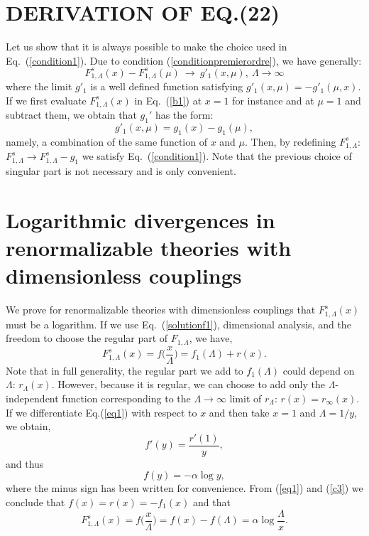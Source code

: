 \documentclass[floatfix,preprintnumbers,amsmath,amssymb,prb,12pt]{revtex4-1}
\begin{document}
{{\section{DERIVATION OF EQ.(22)}
Let us show that it is always possible to make the choice used in
Eq.~(\ref{condition1}). Due to condition
(\ref{conditionpremierordre}), we have generally:
\begin{equation}
F_{1,\Lambda}^{s}(x)-F_{1,\Lambda}^{s}(\mu)\ \to\ g'_1(x,\mu),\
\Lambda\to\infty
\label{b1}
\end{equation}
where the limit $g'_1$ is a well defined function satisfying
$g'_1(x,\mu)=-g'_1(\mu,x)$. If we first evaluate 
$F_{1,\Lambda}^{s}(x)$ in Eq.~(\ref{b1}) at
$x=1$ for instance and at $\mu=1$ and subtract them, we
obtain that $g_1'$ has the form:
\begin{equation}
g'_1(x,\mu)=g_1(x)-g_1(\mu),
\end{equation}
namely, a combination of the same function of $x$ and $\mu$. Then,
by redefining $F_{1,\Lambda}^{s}$: $F_{1,\Lambda}^{s}\to
F_{1,\Lambda}^{s}-g_1$ we satisfy Eq.~(\ref{condition1}). Note
that the previous choice of singular part is not necessary and is
only convenient. 

\section{Logarithmic divergences in renormalizable theories with dimensionless couplings}
We prove  for renormalizable theories with dimensionless
couplings that $F_{1,\Lambda}^s(x)$ must be a logarithm. If we use
Eq.~(\ref{solutionf1}), dimensional analysis, and the freedom to
choose the regular part of 
$F_{1,\Lambda}$, we have,
\begin{equation}
F_{1,\Lambda}^s(x)=f\big(\frac{x}{\Lambda}\big)=f_1(\Lambda) +
r(x).
\label{eq1}
\end{equation}
Note that in full generality, the regular part we add to
$f_1(\Lambda)$ could depend on $\Lambda$: $r_\Lambda(x)$. However,
because it is regular, we can choose to add only the
$\Lambda$-independent function corresponding to the
$\Lambda\to\infty$ limit of $r_\Lambda$: $r(x)=r_\infty(x)$. If
we differentiate Eq.(\ref{eq1}) with respect to $x$ and then take
$x=1$ and
$\Lambda=1/y$, we obtain,
\begin{equation}
f'(y)=\frac{r'(1)}{y},
\end{equation}
and thus
\begin{equation}
f(y)= -\alpha \log y,
\label{c3}
\end{equation}
where the minus sign has been written for convenience. From
(\ref{eq1}) and (\ref{c3}) we conclude that
$f(x)=r(x)=-f_1(x)$ and that
\begin{equation}
F_{1,\Lambda}^s(x)=f\big(\frac{x}{\Lambda}\big)=
f(x)-f(\Lambda)=\alpha
\log\frac{\Lambda}{x}.
\label{eq2}
\end{equation}

}}
\end{document}
